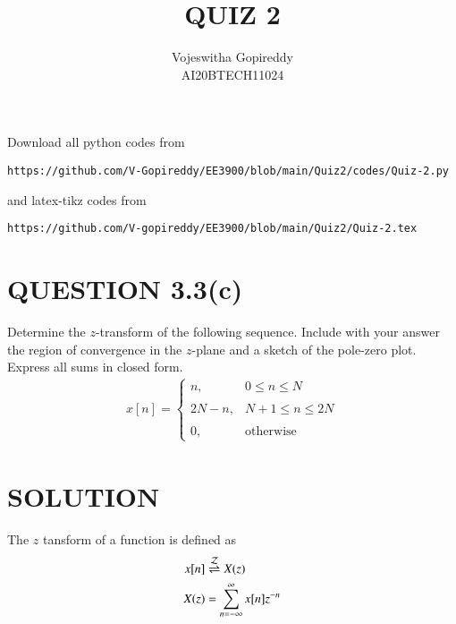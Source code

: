 \documentclass[journal,12pt,twocolumn]{IEEEtran}
\begin{document}
     \def\rightbox#1{\makebox[0in][r]{#1}}
     \def\centbox#1{\makebox[0in]{#1}}
     \def\topbox#1{\raisebox{-\baselineskip}[0in][0in]{#1}}
     \def\midbox#1{\raisebox{-0.5\baselineskip}[0in][0in]{#1}}
\vspace{3cm}
\title{QUIZ 2}
\author{Vojeswitha Gopireddy \\ AI20BTECH11024}
\maketitle
\newpage
\bigskip
\renewcommand{\thefigure}{\theenumi}
\renewcommand{\thetable}{\theenumi}
Download all python codes from 
\begin{lstlisting}
https://github.com/V-Gopireddy/EE3900/blob/main/Quiz2/codes/Quiz-2.py
\end{lstlisting}
%
and latex-tikz codes from 
%
\begin{lstlisting}
https://github.com/V-gopireddy/EE3900/blob/main/Quiz2/Quiz-2.tex
\end{lstlisting}
\section{QUESTION 3.3(c)}
Determine the $z$-transform of the following sequence. Include with your answer the region of convergence in the $z$-plane and a sketch of the pole-zero plot. Express all sums in closed form.
\begin{align}
  x[n] = \begin{cases}
         n, & 0 \leq n \leq N \\~\\[-1em]
	     2N-n, & N+1 \leq n \leq 2N \\~\\[-1em]
	     0, & \text{otherwise}
         \end{cases}
\end{align}
%
\section{SOLUTION}
%
\begin{definition}\label{def:z}
    The $z$ tansform of a function is defined as
    \begin{align}
        x[n] & \overset{\mathcal{Z}}{ \rightleftharpoons} X(z)\\
        X(z) &=\sum_{n=-\infty}^{\infty} x[n]z^{-n}
    \end{align}
\end{definition}
\end{document}
